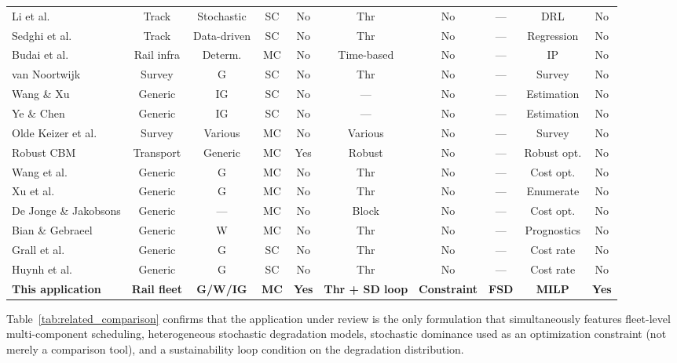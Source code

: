 \documentclass[11pt,a4paper]{article}
\theoremstyle{plain}
\theoremstyle{definition}
\theoremstyle{remark}
\begin{document}
\begin{table}[htbp]
{\begin{tabular}{@{}lccccccccc@{}}
Li et al.\ \cite{li2023track} & Track & Stochastic & SC & No & Thr & No & --- & DRL & No \\
Sedghi et al.\ \cite{sedghi2022} & Track & Data-driven & SC & No & Thr & No & --- & Regression & No \\
Budai et al.\ \cite{budai2006} & Rail infra & Determ. & MC & No & Time-based & No & --- & IP & No \\
van Noortwijk \cite{vannoortwijk2009} & Survey & G & SC & No & Thr & No & --- & Survey & No \\
Wang \& Xu \cite{wang2010} & Generic & IG & SC & No & --- & No & --- & Estimation & No \\
Ye \& Chen \cite{ye2014} & Generic & IG & SC & No & --- & No & --- & Estimation & No \\
Olde Keizer et al.\ \cite{olde2014} & Survey & Various & MC & No & Various & No & --- & Survey & No \\
Robust CBM \cite{robustCBM2023} & Transport & Generic & MC & Yes & Robust & No & --- & Robust opt. & No \\
Wang et al.\ \cite{wang2022cbm} & Generic & G & MC & No & Thr & No & --- & Cost opt. & No \\
Xu et al.\ \cite{xu2021} & Generic & G & MC & No & Thr & No & --- & Enumerate & No \\
De Jonge \& Jakobsons \cite{deJonge2020} & Generic & --- & MC & No & Block & No & --- & Cost opt. & No \\
Bian \& Gebraeel \cite{bian2014} & Generic & W & MC & No & Thr & No & --- & Prognostics & No \\
Grall et al.\ \cite{grall2002} & Generic & G & SC & No & Thr & No & --- & Cost rate & No \\
Huynh et al.\ \cite{huynh2011} & Generic & G & SC & No & Thr & No & --- & Cost rate & No \\
\midrule
\textbf{This application} & \textbf{Rail fleet} & \textbf{G/W/IG} & \textbf{MC} & \textbf{Yes} & \textbf{Thr + SD loop} & \textbf{Constraint} & \textbf{FSD} & \textbf{MILP} & \textbf{Yes} \\
\bottomrule
\end{tabular}%
}
\end{table}

Table~\ref{tab:related_comparison} confirms that the application under review is the only formulation that simultaneously features fleet-level multi-component scheduling, heterogeneous stochastic degradation models, stochastic dominance used as an optimization constraint (not merely a comparison tool), and a sustainability loop condition on the degradation distribution.
\end{document}
